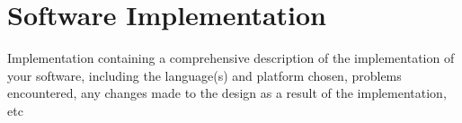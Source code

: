 \section{Software Implementation}

{\color{red} 
Implementation containing a comprehensive description of the implementation of your software, including the language(s) and platform chosen, problems encountered, any changes made to the design as a result of the implementation, etc
}